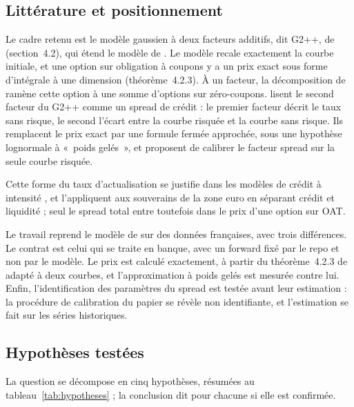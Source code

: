 \subsection*{Littérature et positionnement}

Le cadre retenu est le modèle gaussien à deux facteurs additifs, dit G2++, de \citet{BrigoMercurio2006}
(section~4.2), qui étend le modèle de \citet{HullWhite1990}. Le modèle recale exactement la courbe initiale, et
une option sur obligation à coupons y a un prix exact sous forme d'intégrale à une dimension (théorème~4.2.3).
À un facteur, la décomposition de \citet{Jamshidian1989} ramène cette option à une somme d'options sur
zéro-coupons. \citet{Russo} lisent le second facteur du G2++ comme un spread de crédit : le premier facteur
décrit le taux sans risque, le second l'écart entre la courbe risquée et la courbe sans risque. Ils remplacent
le prix exact par une formule fermée approchée, sous une hypothèse lognormale à «~poids gelés~», et proposent de
calibrer le facteur spread sur la seule courbe risquée.

Cette forme du taux d'actualisation se justifie dans les modèles de crédit à intensité
\citep{DuffieSingleton1999}, et \citet{MonfortRenne2014} l'appliquent aux souverains de la zone euro en séparant
crédit et liquidité ; seul le spread total entre toutefois dans le prix d'une option sur OAT.

Le travail reprend le modèle de \citet{Russo} sur des données françaises, avec trois différences. Le contrat
est celui qui se traite en banque, avec un forward fixé par le repo et non par le modèle. Le prix est calculé
exactement, à partir du théorème~4.2.3 de \citet{BrigoMercurio2006} adapté à deux courbes, et l'approximation à
poids gelés est mesurée contre lui. Enfin, l'identification des paramètres du spread est testée avant leur
estimation : la procédure de calibration du papier se révèle non identifiante, et l'estimation se fait sur les
séries historiques.

\subsection*{Hypothèses testées}

La question se décompose en cinq hypothèses, résumées au tableau~\ref{tab:hypotheses} ; la conclusion dit
pour chacune si elle est confirmée.

